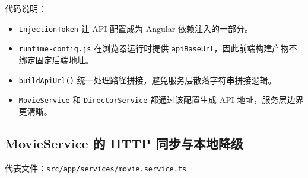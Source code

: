 \documentclass[
]{ctexart}
\providecommand{\tightlist}{%
  \setlength{\itemsep}{0pt}\setlength{\parskip}{0pt}}
\begin{document}
代码说明：

\begin{itemize}
\tightlist
\item
  \texttt{InjectionToken} 让 API 配置成为 Angular 依赖注入的一部分。
\item
  \texttt{runtime-config.js} 在浏览器运行时提供
  \texttt{apiBaseUrl}，因此前端构建产物不绑定固定后端地址。
\item
  \texttt{buildApiUrl()}
  统一处理路径拼接，避免服务层散落字符串拼接逻辑。
\item
  \texttt{MovieService} 和 \texttt{DirectorService} 都通过该配置生成 API
  地址，服务层边界更清晰。
\end{itemize}

\hypertarget{movieservice-ux7684-http-ux540cux6b65ux4e0eux672cux5730ux964dux7ea7}{%
\subsection{MovieService 的 HTTP
同步与本地降级}\label{movieservice-ux7684-http-ux540cux6b65ux4e0eux672cux5730ux964dux7ea7}}

代表文件：\texttt{src/app/services/movie.service.ts}
\end{document}
